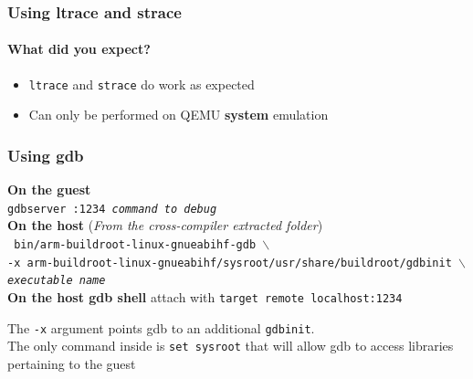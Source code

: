 \begin{frame}
  \frametitle{Using ltrace and strace}
  \framesubtitle{What did you expect?}
  \begin{itemize}
    \item \texttt{ltrace} and \texttt{strace} do work as expected
    \item Can only be performed on QEMU \textbf{system} emulation
  \end{itemize}
\end{frame}
\begin{frame}
  \frametitle{Using gdb}
  \textbf{On the guest} \\
  \texttt{gdbserver :1234 \textit{command to debug}} \\
  \textbf{On the host} (\textit{From the cross-compiler extracted folder}) \\
  \texttt{
    \small
    bin/{\tiny arm-buildroot-linux-gnueabihf-}gdb $\backslash$ \\
      \quad -x {\tiny arm-buildroot-linux-gnueabihf}/sysroot/usr/share/buildroot/gdbinit $\backslash$ \\
      \quad \textit{executable name}
  }\\
  \textbf{On the host gdb shell} attach with \texttt{target remote localhost:1234}
\end{frame}
 {
  The \texttt{-x} argument points gdb to an additional \texttt{gdbinit}. \\
  The only command inside is \texttt{set sysroot} that will allow gdb to access libraries pertaining to the guest
}


